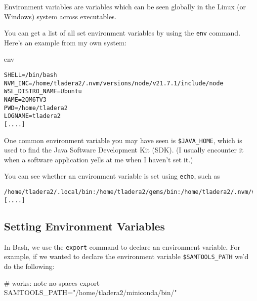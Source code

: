 \documentclass[
  letterpaper,
  DIV=11,
  numbers=noendperiod]{scrreprt}
\newenvironment{Shaded}{\begin{snugshade}}{\end{snugshade}}
\newcommand{\BuiltInTok}[1]{\textcolor[rgb]{0.00,0.23,0.31}{#1}}
\newcommand{\CommentTok}[1]{\textcolor[rgb]{0.37,0.37,0.37}{#1}}
\newcommand{\FunctionTok}[1]{\textcolor[rgb]{0.28,0.35,0.67}{#1}}
\newcommand{\OperatorTok}[1]{\textcolor[rgb]{0.37,0.37,0.37}{#1}}
\newcommand{\StringTok}[1]{\textcolor[rgb]{0.13,0.47,0.30}{#1}}
\newcommand{\VariableTok}[1]{\textcolor[rgb]{0.07,0.07,0.07}{#1}}
\begin{document}
Environment variables are variables which can be seen globally in the
Linux (or Windows) system across executables.

You can get a list of all set environment variables by using the
\texttt{env} command. Here's an example from my own system:

\begin{Shaded}
\begin{Highlighting}[]
\FunctionTok{env}
\end{Highlighting}
\end{Shaded}

\begin{verbatim}
SHELL=/bin/bash
NVM_INC=/home/tladera2/.nvm/versions/node/v21.7.1/include/node
WSL_DISTRO_NAME=Ubuntu
NAME=2QM6TV3
PWD=/home/tladera2
LOGNAME=tladera2
[....]
\end{verbatim}

One common environment variable you may have seen is
\texttt{\$JAVA\_HOME}, which is used to find the Java Software
Development Kit (SDK). (I usually encounter it when a software
application yells at me when I haven't set it.)

You can see whether an environment variable is set using \texttt{echo},
such as

\begin{Shaded}
\end{Shaded}

\begin{verbatim}
/home/tladera2/.local/bin:/home/tladera2/gems/bin:/home/tladera2/.nvm/versions/node/v21.7.1/bin:/usr/local/sbin:/usr/local/bin:/usr/sbin:/usr/bin:/sbin:/bin:/usr/games:/usr/local/games:/ [....]
\end{verbatim}

\subsection{Setting Environment
Variables}\label{setting-environment-variables}

In Bash, we use the \texttt{export} command to declare an environment
variable. For example, if we wanted to declare the environment variable
\texttt{\$SAMTOOLS\_PATH} we'd do the following:

\begin{Shaded}
\begin{Highlighting}[]
\CommentTok{\# works: note no spaces}
\BuiltInTok{export} \VariableTok{SAMTOOLS\_PATH}\OperatorTok{=}\StringTok{"/home/tladera2/miniconda/bin/"}
\end{Highlighting}
\end{Shaded}
\end{document}
